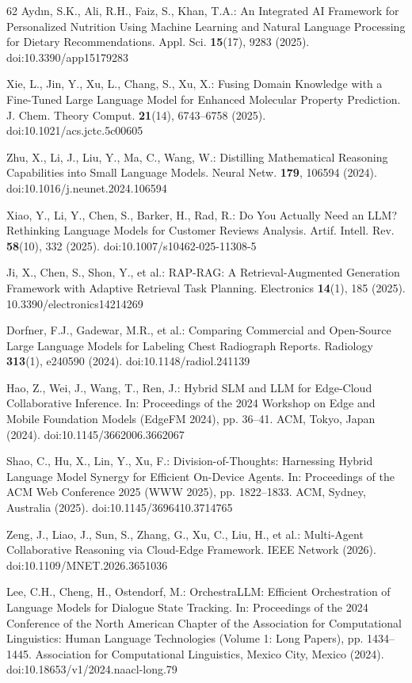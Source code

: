 \begin{thebibliography}{62}
Aydın, S.K., Ali, R.H., Faiz, S., Khan, T.A.: An Integrated AI Framework for Personalized Nutrition Using Machine Learning and Natural Language Processing for Dietary Recommendations. Appl. Sci. \textbf{15}(17), 9283 (2025). doi:10.3390/app15179283

Xie, L., Jin, Y., Xu, L., Chang, S., Xu, X.: Fusing Domain Knowledge with a Fine-Tuned Large Language Model for Enhanced Molecular Property Prediction. J. Chem. Theory Comput. \textbf{21}(14), 6743--6758 (2025). doi:10.1021/acs.jctc.5c00605

Zhu, X., Li, J., Liu, Y., Ma, C., Wang, W.: Distilling Mathematical Reasoning Capabilities into Small Language Models. Neural Netw. \textbf{179}, 106594 (2024). doi:10.1016/j.neunet.2024.106594

Xiao, Y., Li, Y., Chen, S., Barker, H., Rad, R.: Do You Actually Need an LLM? Rethinking Language Models for Customer Reviews Analysis. Artif. Intell. Rev. \textbf{58}(10), 332 (2025). doi:10.1007/s10462-025-11308-5

Ji, X., Chen, S., Shon, Y., et al.: RAP-RAG: A Retrieval-Augmented Generation Framework with Adaptive Retrieval Task Planning. Electronics \textbf{14}(1), 185 (2025). 10.3390/electronics14214269

Dorfner, F.J., Gadewar, M.R., et al.: Comparing Commercial and Open-Source Large Language Models for Labeling Chest Radiograph Reports. Radiology \textbf{313}(1), e240590 (2024). doi:10.1148/radiol.241139

Hao, Z., Wei, J., Wang, T., Ren, J.: Hybrid SLM and LLM for Edge-Cloud Collaborative Inference. In: Proceedings of the 2024 Workshop on Edge and Mobile Foundation Models (EdgeFM 2024), pp. 36--41. ACM, Tokyo, Japan (2024). doi:10.1145/3662006.3662067

Shao, C., Hu, X., Lin, Y., Xu, F.: Division-of-Thoughts: Harnessing Hybrid Language Model Synergy for Efficient On-Device Agents. In: Proceedings of the ACM Web Conference 2025 (WWW 2025), pp. 1822--1833. ACM, Sydney, Australia (2025). doi:10.1145/3696410.3714765

Zeng, J., Liao, J., Sun, S., Zhang, G., Xu, C., Liu, H., et al.: Multi-Agent Collaborative Reasoning via Cloud-Edge Framework. IEEE Network (2026). doi:10.1109/MNET.2026.3651036

Lee, C.H., Cheng, H., Ostendorf, M.: OrchestraLLM: Efficient Orchestration of Language Models for Dialogue State Tracking. In: Proceedings of the 2024 Conference of the North American Chapter of the Association for Computational Linguistics: Human Language Technologies (Volume 1: Long Papers), pp. 1434--1445. Association for Computational Linguistics, Mexico City, Mexico (2024). doi:10.18653/v1/2024.naacl-long.79


\end{thebibliography}
